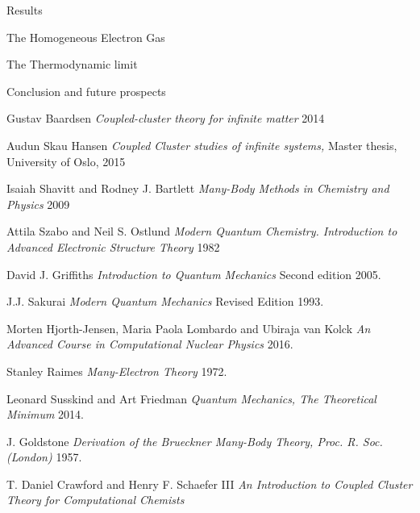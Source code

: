 \documentclass[twoside,english]{uiofysmaster}
\begin{document}
\begin{chapter}{Results}
\begin{section}{The Homogeneous Electron Gas}
		\begin{subsection}{The Thermodynamic limit}
			
		\end{subsection}

	\end{section}

\end{chapter}



\begin{chapter}{Conclusion and future prospects}
	
\end{chapter}


\medskip


\begin{thebibliography}{9}

	Gustav Baardsen
	\textit{Coupled-cluster theory for infinite matter} 2014

	Audun Skau Hansen
	\textit{Coupled Cluster studies of infinite systems,} Master thesis, University of Oslo, 2015

	Isaiah Shavitt and Rodney J. Bartlett
	\textit{Many-Body Methods in Chemistry and Physics} 2009

	Attila Szabo and Neil S. Ostlund
	\textit{Modern Quantum Chemistry. Introduction to Advanced Electronic Structure Theory} 1982

	David J. Griffiths
	\textit{Introduction to Quantum Mechanics} Second edition 2005.

	J.J. Sakurai
	\textit{Modern Quantum Mechanics} Revised Edition 1993.

	Morten Hjorth-Jensen, Maria Paola Lombardo and Ubiraja van Kolck
	\textit{An Advanced Course in Computational Nuclear Physics} 2016.

	Stanley Raimes
	\textit{Many-Electron Theory} 1972.

	Leonard Susskind and Art Friedman
	\textit{Quantum Mechanics, The Theoretical Minimum} 2014.

	J. Goldstone
	\textit{Derivation of the Brueckner Many-Body Theory, Proc. R. Soc. (London)} 1957. 

	T. Daniel Crawford and Henry F. Schaefer III
	\textit{An Introduction to Coupled Cluster Theory for Computational Chemists} 


\end{thebibliography}
\end{document}
